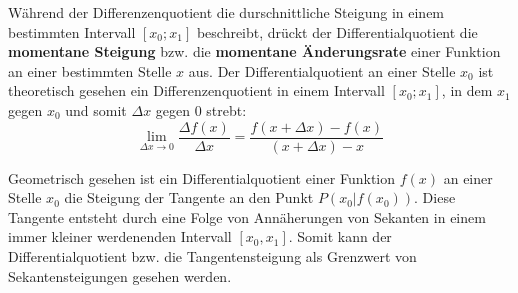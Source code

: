 \begin{figure}[h!]
\centering
\end{figure}

\pagebreak


W\"{a}hrend der Differenzenquotient die durschnittliche Steigung in einem bestimmten Intervall $[x_{0};x_{1}]$ beschreibt, dr\"{u}ckt der Differentialquotient die \textbf{momentane Steigung} bzw. die \textbf{momentane \"{A}nderungsrate} einer Funktion an einer bestimmten Stelle $x$ aus. Der Differentialquotient an einer Stelle $x_{0}$ ist theoretisch gesehen ein Differenzenquotient in einem Intervall $[x_{0};x_{1}]$, in dem $x_{1}$ gegen $x_{0}$ und somit $\Delta x$ gegen $0$ strebt: $$\lim_{\Delta x\to0}\frac{\Delta f(x)}{\Delta x} = \frac{f(x + \Delta x) - f(x)}{(x + \Delta x) - x}$$

Geometrisch gesehen ist ein Differentialquotient einer Funktion $f(x)$ an einer Stelle $x_{0}$ die Steigung der Tangente an den Punkt $P(x_{0}|f(x_{0}))$. Diese Tangente entsteht durch eine Folge von Ann\"{a}herungen von Sekanten in einem immer kleiner werdenenden Intervall $[x_{0}, x_{1}]$. Somit kann der Differentialquotient bzw. die Tangentensteigung als Grenzwert von Sekantensteigungen gesehen werden.

